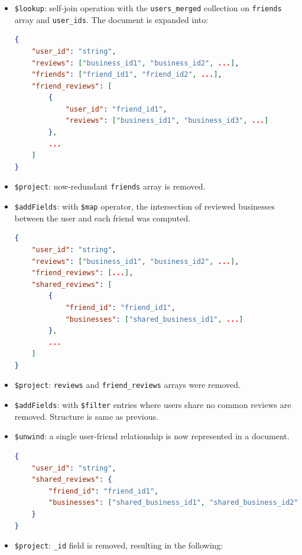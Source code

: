 \documentclass{Configuration_Files/PoliMi3i_thesis}
\begin{document}
\begin{itemize}
\begin{itemize}
\item \texttt{\$lookup}: self-join operation with the \texttt{users\_merged} collection on \texttt{friends} array and \texttt{user\_ids}. The document is expanded into:

\begin{lstlisting}[language=json]
{
    "user_id": "string",
    "reviews": ["business_id1", "business_id2", ...],
    "friends": ["friend_id1", "friend_id2", ...],
    "friend_reviews": [
        {
            "user_id": "friend_id1",
            "reviews": ["business_id1", "business_id3", ...]
        },
        ...
    ]
}
\end{lstlisting}

\item \texttt{\$project}: now-redundant \texttt{friends} array is removed.

\item \texttt{\$addFields}: with \texttt{\$map} operator, the intersection of reviewed businesses between the user and each friend was computed.

\begin{lstlisting}[language=json]
{
    "user_id": "string",
    "reviews": ["business_id1", "business_id2", ...],
    "friend_reviews": [...],
    "shared_reviews": [
        {
            "friend_id": "friend_id1",
            "businesses": ["shared_business_id1", ...]
        },
        ...
    ]
}
\end{lstlisting}

\item \texttt{\$project}: \texttt{reviews} and \texttt{friend\_reviews} arrays were removed.

\item \texttt{\$addFields}: with \texttt{\$filter} entries where users share no common reviews are removed. Structure is same as previous.

\item \texttt{\$unwind}: a single user-friend relationship is now represented in a document.

\begin{lstlisting}[language=json]
{
    "user_id": "string",
    "shared_reviews": {
        "friend_id": "friend_id1",
        "businesses": ["shared_business_id1", "shared_business_id2", ...]
    }
}
\end{lstlisting}

\item \texttt{\$project}: \texttt{\_id} field is removed, resulting in the following:


\end{itemize}
\end{itemize}
\end{document}
